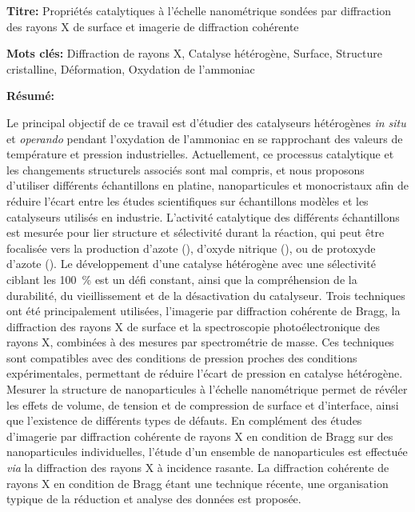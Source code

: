 \begin{mdframed}[linecolor=Prune,linewidth=1]

\textbf{Titre:} Propriétés catalytiques à l’échelle nanométrique sondées par diffraction des rayons X de surface et imagerie de diffraction cohérente

\noindent \textbf{Mots clés:} Diffraction de rayons X, Catalyse hétérogène, Surface, Structure cristalline, Déformation, Oxydation de l'ammoniac

\vspace{-.5cm}
\begin{multicols}{2}
\noindent \textbf{Résumé:}

Le principal objectif de ce travail est d'étudier des catalyseurs hétérogènes \textit{in situ} et \textit{operando} pendant l'oxydation de l'ammoniac en se rapprochant des valeurs de température et pression industrielles.
Actuellement, ce processus catalytique et les changements structurels associés sont mal compris, et nous proposons d'utiliser différents échantillons en platine, nanoparticules et monocristaux afin de réduire l'écart entre les études scientifiques sur échantillons modèles et les catalyseurs utilisés en industrie.
L'activité catalytique des différents échantillons est mesurée pour lier structure et sélectivité durant la réaction, qui peut être focalisée vers la production d'azote (), d'oxyde nitrique (), ou de protoxyde d'azote ().
Le développement d'une catalyse hétérogène avec une sélectivité ciblant les \qty{100}{\percent} est un défi constant, ainsi que la compréhension de la durabilité, du vieillissement et de la désactivation du catalyseur.
Trois techniques ont été principalement utilisées, l'imagerie par diffraction cohérente de Bragg, la diffraction des rayons X de surface et la spectroscopie photoélectronique des rayons X, combinées à des mesures par spectrométrie de masse.
Ces techniques sont compatibles avec des conditions de pression proches des conditions expérimentales, permettant de réduire l'écart de pression en catalyse hétérogène.
Mesurer la structure de nanoparticules à l'échelle nanométrique permet de révéler les effets de volume, de tension et de compression de surface et d'interface, ainsi que l'existence de différents types de défauts.
En complément des études d'imagerie par diffraction cohérente de rayons X en condition de Bragg sur des nanoparticules individuelles, l'étude d'un ensemble de nanoparticules est effectuée \textit{via} la diffraction des rayons X à incidence rasante.
La diffraction cohérente de rayons X en condition de Bragg étant une technique récente, une organisation typique de la réduction et analyse des données est proposée.

\end{multicols}
\end{mdframed}
